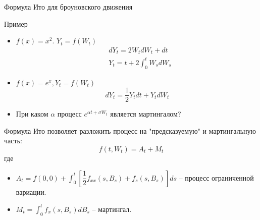 \documentclass{beamer}
\begin{document}
\begin{frame}{Формула Ито для броуновского движения}
     
\end{frame}

\begin{frame}{Пример}

\begin{itemize}
    \item $f(x) =x^2$. $Y_t = f(W_t)$
    \begin{align*}
        &dY_t = 2 W_t dW_t + dt  \\
        &Y_t = t + 2 \int_0^t W_s dW_s
    \end{align*}
    \item $f(x) = e^{x}, Y_t = f(W_t)$
    $$
        dY_t = \dfrac{1}{2}Y_t dt + Y_t dW_t
    $$
    \item При каком $\alpha$ процесс $e^{\alpha t + \sigma W_t}$ является мартингалом? 
\end{itemize}
\end{frame}

\begin{frame}
Формула Ито позволяет разложить процесс на "предсказуемую" и мартингальную часть:
$$
    f(t, W_t) = A_t + M_t
$$где 
\begin{itemize}
    \item $A_t = f(0, 0) + \int_0^t \left[\dfrac{1}{2}f_{xx}(s, B_s) + f_s(s, B_s)\right] ds$ -- процесс ограниченной вариации.
    \item $M_t = \int_0^t f_x(s, B_s) dB_s$ -- мартингал.
\end{itemize}
\end{frame}
\end{document}
